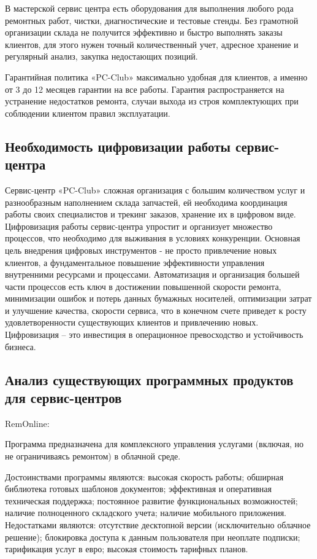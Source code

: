 В мастерской сервис центра есть оборудования для выполнения любого рода ремонтных работ, чистки, диагностические и тестовые стенды. Без грамотной организации склада не получится эффективно и быстро выполнять заказы клиентов, для этого нужен точный количественный учет, адресное хранение и регулярный анализ, закупка недостающих позиций.

Гарантийная политика «PC-Club» максимально удобная для клиентов, а именно от 3 до 12 месяцев гарантии на все работы. Гарантия распространяется на устранение недостатков ремонта, случаи выхода из строя комплектующих при соблюдении клиентом правил эксплуатации.

\subsection{Необходимость цифровизации работы сервис-центра}

Сервис-центр «PC-Club» сложная организация с большим количеством услуг и разнообразным наполнением склада запчастей, ей необходима координация работы своих специалистов и трекинг заказов, хранение их в цифровом виде. Цифровизация работы сервис-центра упростит и организует множество процессов, что необходимо для выживания в условиях конкуренции. Основная цель внедрения цифровых инструментов - не просто привлечение новых клиентов, а фундаментальное повышение эффективности управления внутренними ресурсами и процессами. Автоматизация и организация большей части процессов есть ключ в достижении повышенной скорости ремонта, минимизации ошибок и потерь данных бумажных носителей, оптимизации затрат и улучшение качества, скорости сервиса, что в конечном счете приведет к росту удовлетворенности существующих клиентов и привлечению новых. Цифровизация – это инвестиция в операционное превосходство и устойчивость бизнеса.

\subsection{Анализ существующих программных продуктов для сервис-центров}

RemOnline:

Программа предназначена для комплексного управления услугами (включая, но не ограничиваясь ремонтом) в облачной среде.

Достоинствами программы являются: высокая скорость работы; обширная библиотека готовых шаблонов документов; эффективная и оперативная техническая поддержка; постоянное развитие функциональных возможностей; наличие полноценного складского учета; наличие мобильного приложения.
Недостатками являются: отсутствие десктопной версии (исключительно облачное решение); блокировка доступа к данным пользователя при неоплате подписки; тарификация услуг в евро; высокая стоимость тарифных планов.

